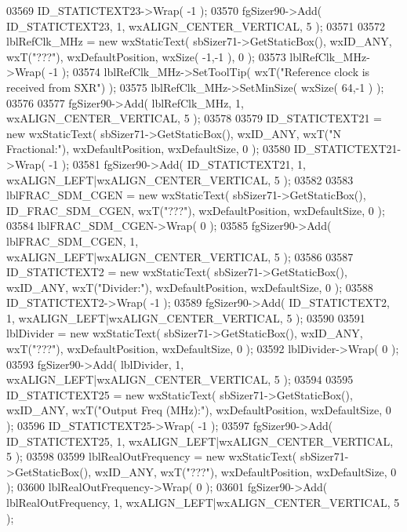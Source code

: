 \begin{DoxyCode}
03569     ID_STATICTEXT23->Wrap( -1 );
03570     fgSizer90->Add( ID_STATICTEXT23, 1, wxALIGN\_CENTER\_VERTICAL, 5 );
03571     
03572     lblRefClk_MHz = \textcolor{keyword}{new} wxStaticText( sbSizer71->GetStaticBox(), wxID\_ANY, wxT(\textcolor{stringliteral}{"???"}), wxDefaultPosition, 
      wxSize( -1,-1 ), 0 );
03573     lblRefClk_MHz->Wrap( -1 );
03574     lblRefClk_MHz->SetToolTip( wxT(\textcolor{stringliteral}{"Reference clock is received from SXR"}) );
03575     lblRefClk_MHz->SetMinSize( wxSize( 64,-1 ) );
03576     
03577     fgSizer90->Add( lblRefClk_MHz, 1, wxALIGN\_CENTER\_VERTICAL, 5 );
03578     
03579     ID_STATICTEXT21 = \textcolor{keyword}{new} wxStaticText( sbSizer71->GetStaticBox(), wxID\_ANY, wxT(\textcolor{stringliteral}{"N Fractional:"}), 
      wxDefaultPosition, wxDefaultSize, 0 );
03580     ID_STATICTEXT21->Wrap( -1 );
03581     fgSizer90->Add( ID_STATICTEXT21, 1, wxALIGN\_LEFT|wxALIGN\_CENTER\_VERTICAL, 5 );
03582     
03583     lblFRAC_SDM_CGEN = \textcolor{keyword}{new} wxStaticText( sbSizer71->GetStaticBox(), 
      ID_FRAC_SDM_CGEN, wxT(\textcolor{stringliteral}{"???"}), wxDefaultPosition, wxDefaultSize, 0 );
03584     lblFRAC_SDM_CGEN->Wrap( 0 );
03585     fgSizer90->Add( lblFRAC_SDM_CGEN, 1, wxALIGN\_LEFT|wxALIGN\_CENTER\_VERTICAL, 5 );
03586     
03587     ID_STATICTEXT2 = \textcolor{keyword}{new} wxStaticText( sbSizer71->GetStaticBox(), wxID\_ANY, wxT(\textcolor{stringliteral}{"Divider:"}), 
      wxDefaultPosition, wxDefaultSize, 0 );
03588     ID_STATICTEXT2->Wrap( -1 );
03589     fgSizer90->Add( ID_STATICTEXT2, 1, wxALIGN\_LEFT|wxALIGN\_CENTER\_VERTICAL, 5 );
03590     
03591     lblDivider = \textcolor{keyword}{new} wxStaticText( sbSizer71->GetStaticBox(), wxID\_ANY, wxT(\textcolor{stringliteral}{"???"}), wxDefaultPosition, 
      wxDefaultSize, 0 );
03592     lblDivider->Wrap( 0 );
03593     fgSizer90->Add( lblDivider, 1, wxALIGN\_LEFT|wxALIGN\_CENTER\_VERTICAL, 5 );
03594     
03595     ID_STATICTEXT25 = \textcolor{keyword}{new} wxStaticText( sbSizer71->GetStaticBox(), wxID\_ANY, wxT(\textcolor{stringliteral}{"Output Freq (MHz):"}), 
      wxDefaultPosition, wxDefaultSize, 0 );
03596     ID_STATICTEXT25->Wrap( -1 );
03597     fgSizer90->Add( ID_STATICTEXT25, 1, wxALIGN\_LEFT|wxALIGN\_CENTER\_VERTICAL, 5 );
03598     
03599     lblRealOutFrequency = \textcolor{keyword}{new} wxStaticText( sbSizer71->GetStaticBox(), wxID\_ANY, wxT(\textcolor{stringliteral}{"???"}), 
      wxDefaultPosition, wxDefaultSize, 0 );
03600     lblRealOutFrequency->Wrap( 0 );
03601     fgSizer90->Add( lblRealOutFrequency, 1, wxALIGN\_LEFT|wxALIGN\_CENTER\_VERTICAL, 5 );

\end{DoxyCode}
